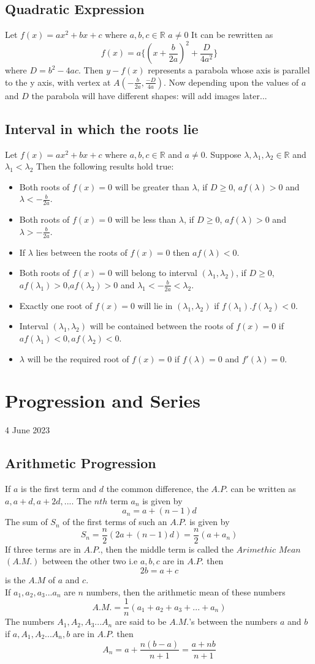 \documentclass[twocolumn, 10pt]{article}
\begin{document}
\subsection{Quadratic Expression}
Let $f(x)=ax^2+bx+c$ where $a,b,c \in \mathbb{R}$ $a \not= 0$
It can be rewritten as $$f(x)=a\{(x+ \frac{b}{2a})^2 + \frac{D}{4a^2}\}$$ where $D=b^2-4ac$. Then $y-f(x)$ represents a parabola whose axis is parallel to the y axis, with vertex at $A(-\frac{b}{2a},\frac{-D}{4a})$. Now depending upon the values of $a$ and $D$ the parabola will have different shapes:
will add images  later...
\subsection{Interval in which the roots lie}
Let $f(x)=ax^2+bx+c$ where $a,b,c \in \mathbb{R}$ and $a \not= 0$. Suppose $\lambda,\lambda _1, \lambda _2 \in \mathbb{R}$ and $\lambda_1 < \lambda_2$ Then the following results hold true:
\begin{itemize}
\item Both roots of $f(x)=0$ will be greater than $\lambda$, if $D \ge 0$, $af(\lambda)>0$ and $\lambda<-\frac{b}{2a}$.
\item Both roots of $f(x)=0$ will be less than $\lambda$, if $D \ge 0$, $af(\lambda)>0$ and $\lambda>-\frac{b}{2a}$.
\item If $\lambda$ lies between the roots of $f(x)=0$ then $af(\lambda)<0$.
\item Both roots of $f(x)=0$ will belong to interval $(\lambda_1,\lambda_2)$, if $D \ge 0$, $af(\lambda_1)>0$,$af(\lambda_2)>0$ and $\lambda_1<-\frac{b}{2a}<\lambda_2$.
\item Exactly one root of $f(x)=0$ will lie in $(\lambda_1,\lambda_2)$ if $f(\lambda_1). f(\lambda_2)<0$.
\item Interval $(\lambda_1,\lambda_2)$ will be contained between the roots of $f(x)=0$ if $af(\lambda_1)<0,af(\lambda_2)<0$.
\item $\lambda$ will be the required root of $f(x)=0$ if $f(\lambda)=0$ and $f'(\lambda)=0$.
\end{itemize}
\section{Progression and Series}
4 June 2023
\subsection{Arithmetic Progression}
If $a$ is the first term and $d$ the common difference, the $A.P.$ can be written as $a,a+d,a+2d,...$. The $nth$ term $a_n$ is given by 
$$a_n=a+(n-1)d$$ The sum of $S_n$ of the first terms of such an $A.P.$ is given by $$S_n=\frac{n}{2}(2a+(n-1)d)=\frac{n}{2}(a+a_n)$$
If three terms are in $A.P.$, then the middle term is called the $Arimethic$ $Mean$ $(A.M.)$ between the other two i.e $a,b,c$ are in $A.P.$ then $$2b=a+c$$ is the $A.M$ of $a$ and $c$.\\
If $a_1,a_2,a_3...a_n$ are $n$ numbers, then the arithmetic mean of these numbers $$A.M.=\frac{1}{n}(a_1+a_2+a_3+...+a_n)$$
The numbers $A_1,A_2,A_3...A_n$ are said to be $A.M.$'s between the numbers $a$ and $b$ if $a,A_1,A_2...A_n,b$ are in $A.P.$ then
$$A_n=a+\frac{n(b-a)}{n+1}=\frac{a+nb}{n+1}$$
\end{document}
